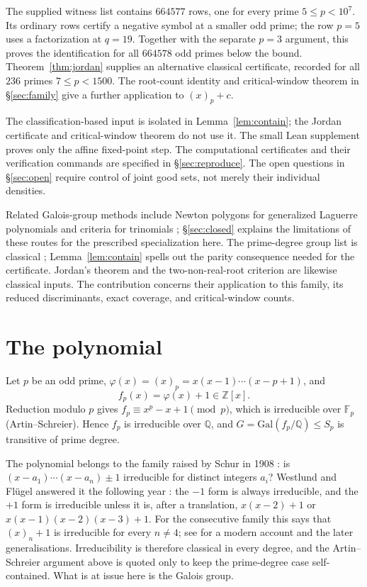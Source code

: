 \documentclass[11pt,a4paper]{amsart}
\newcommand{\F}{\mathbb{F}}
\newcommand{\Q}{\mathbb{Q}}
\newcommand{\Z}{\mathbb{Z}}
\newcommand{\Gal}{\mathrm{Gal}}
\theoremstyle{plain}
\theoremstyle{definition}
\begin{document}
The supplied witness list contains \(664577\) rows, one for every prime \(5\le p<10^7\). Its ordinary rows certify a negative symbol at a smaller odd prime; the row \(p=5\) uses a factorization at \(q=19\). Together with the separate \(p=3\) argument, this proves the identification for all \(664578\) odd primes below the bound. Theorem~\ref{thm:jordan} supplies an alternative classical certificate, recorded for all \(236\) primes \(7\le p<1500\). The root-count identity and critical-window theorem in \S\ref{sec:family} give a further application to \((x)_p+c\).

The classification-based input is isolated in Lemma~\ref{lem:contain}; the Jordan certificate and critical-window theorem do not use it. The small Lean supplement proves only the affine fixed-point step. The computational certificates and their verification commands are specified in \S\ref{sec:reproduce}. The open questions in \S\ref{sec:open} require control of joint good sets, not merely their individual densities.

Related Galois-group methods include Newton polygons for generalized Laguerre polynomials \cite{Hajir} and criteria for trinomials \cite{NartVila,Osada}; \S\ref{sec:closed} explains the limitations of these routes for the prescribed specialization here. The prime-degree group list is classical \cite[Thm.~2.1]{JonesZvonkin}; Lemma~\ref{lem:contain} spells out the parity consequence needed for the certificate. Jordan's theorem \cite[Thm.~13.9]{Wielandt} and the two-non-real-root criterion \cite[Thm.~3.2]{ConradPerm} are likewise classical inputs. The contribution concerns their application to this family, its reduced discriminants, exact coverage, and critical-window counts.

\section{The polynomial}
\label{sec:poly}

Let \(p\) be an odd prime, \(\varphi(x)=(x)_p=x(x-1)\cdots(x-p+1)\), and
\[
f_p(x)=\varphi(x)+1\in\Z[x].
\]
Reduction modulo \(p\) gives \(f_p\equiv x^p-x+1\pmod p\), which is irreducible over \(\F_p\) (Artin--Schreier). Hence \(f_p\) is irreducible over \(\Q\), and \(G=\Gal(f_p/\Q)\le S_p\) is transitive of prime degree.

The polynomial belongs to the family raised by Schur in 1908 \cite{Schur1908}: is \((x-a_1)\cdots(x-a_n)\pm1\) irreducible for distinct integers \(a_i\)? Westlund and Fl\"ugel answered it the following year \cite{Westlund}: the \(-1\) form is always irreducible, and the \(+1\) form is irreducible unless it is, after a translation, \(x(x-2)+1\) or \(x(x-1)(x-2)(x-3)+1\). For the consecutive family this says that \((x)_n+1\) is irreducible for every \(n\ne4\); see \cite{GyoryHajduTijdeman} for a modern account and the later generalisations. Irreducibility is therefore classical in every degree, and the Artin--Schreier argument above is quoted only to keep the prime-degree case self-contained. What is at issue here is the Galois group.
\end{document}
